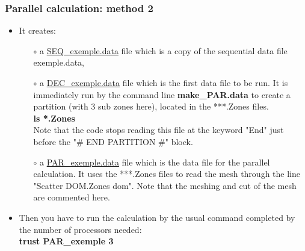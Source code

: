 \documentclass[10pt]{beamer}
\begin{document}
\begin{frame}
\frametitle{Parallel calculation: method 2}
\begin{block}{}

\begin{itemize}
\item It creates:
    \begin{itemize} 
    \item [$\circ$] a \underline{SEQ\_exemple.data} file which is a copy of the sequential data file exemple.data,
    \item [$\circ$] a \underline{DEC\_exemple.data} file which is the first data file to be run. It is immediately run by the command line \textbf{make\_PAR.data} to create a partition (with 3 sub zones here), located in the ***.Zones files. \\
    \textbf{ls *.Zones}\\
    Note that the code stops reading this file at the keyword "End" just before the "\# END PARTITION \#" block.
    \item [$\circ$] a \underline{PAR\_exemple.data} file which is the data file for the parallel calculation. It uses the ***.Zones files to read the mesh through the line "Scatter DOM.Zones dom". Note that the meshing and cut of the mesh are commented here.
    \end{itemize}

\item Then you have to run the calculation by the usual command completed by the number of processors needed:\\
\textbf{trust PAR\_exemple 3}
\end{itemize}

\end{block}
\end{frame}
\end{document}
